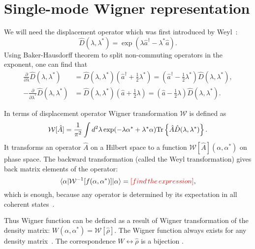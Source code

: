\section{Single-mode Wigner representation}

We will need the displacement operator which was first introduced by Weyl~\cite{Weyl1950}:
\begin{equation}
\label{eqn:formalism:sm-wigner:dispacement-op}
	\hat{D}(\lambda, \lambda^*) = \exp(\lambda \hat{a}^\dagger - \lambda^* \hat{a}).
\end{equation}
Using Baker-Hausdorff theorem to split non-commuting operators in the exponent,
one can find that
\begin{equation}
\label{eqn:formalism:sm-wigner:displacement-derivatives}
\begin{split}
	\frac{\partial}{\partial \lambda} \hat{D}(\lambda, \lambda^*)
	& = \hat{D}(\lambda, \lambda^*) (\hat{a}^\dagger + \frac{1}{2} \lambda^*)
	= (\hat{a}^\dagger - \frac{1}{2} \lambda^*) \hat{D}(\lambda, \lambda^*), \\
	-\frac{\partial}{\partial \lambda^*} \hat{D}(\lambda, \lambda^*)
	& = \hat{D}(\lambda, \lambda^*) (\hat{a} + \frac{1}{2} \lambda)
	= (\hat{a} - \frac{1}{2} \lambda) \hat{D}(\lambda, \lambda^*).
\end{split}
\end{equation}

In terms of displacement operator Wigner transformation $\mathcal{W}$ is defined as
\begin{equation}
\label{eqn:formalism:sm-wigner:w-transformation}
	\mathcal{W}[\hat{A}]
	= \frac{1}{\pi^2} \int d^2 \lambda \exp(-\lambda \alpha^* + \lambda^* \alpha)
		\mathrm{Tr} \left\{  \hat{A} \hat{D}(\lambda, \lambda^*)  \right\}.
\end{equation}
It transforms an operator $\hat{A}$ on a Hilbert space to a function $\mathcal{W}[\hat{A}](\alpha, \alpha^*)$ on phase space.
The backward transformation (called the Weyl transformation) gives back matrix elements of the operator:
\[
	\langle \alpha \lvert \mathcal{W}^{-1}[f(\alpha, \alpha^*)] \rvert \alpha \rangle
	= \textcolor{red}{[find\,the\,expression]},
\]
which is enough, because any operator is determined by its expectation in all coherent states~\cite{Gardiner2004}.

Thus Wigner function can be defined as a result of Wigner transformation of the density matrix: $W(\alpha, \alpha^*) = \mathcal{W}[\hat{\rho}]$.
The Wigner function always exists for any density matrix~\cite{Gardiner2004}.
The correspondence $W \leftrightarrow \hat{\rho}$ is a bijection .

